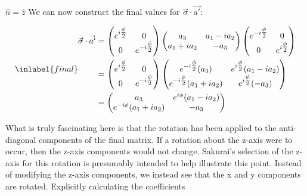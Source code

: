 \begin{answer}
\begin{answerpart}{\texorpdfstring{$\hat{n} = \hat{z}$}{n = z}}
    We can now construct the final values for $\vec{\sigma} \cdot
    \vec{a'}$:

    \begin{equation}
      \inlabel{final}
      \begin{split}
        \vec{\sigma} \cdot \vec{a'}
        &=
        \begin{pmatrix}
          e^{i \tfrac \phi 2} & 0\\
          0 & e^{-i \tfrac \phi 2}\\
        \end{pmatrix}
        \begin{pmatrix}
          a_3  & a_1 - ia_2 \\
          a_1 + ia_2 & -a_3 \\
        \end{pmatrix}
        \begin{pmatrix}
          e^{-i \tfrac \phi 2} & 0\\
          0 & e^{i \tfrac \phi 2}\\
        \end{pmatrix}\\
        &=
        \begin{pmatrix}
          e^{i \tfrac \phi 2} & 0\\
          0 & e^{-i \tfrac \phi 2}\\
        \end{pmatrix}
        \begin{pmatrix}
          e^{-i \tfrac \phi 2}(a_3)  & e^{i \tfrac \phi 2}(a_1 - ia_2) \\
          e^{-i \tfrac \phi 2}(a_1 + ia_2) & e^{i \tfrac \phi 2}(-a_3) \\
        \end{pmatrix}\\
        &=
        \begin{pmatrix}
          a_3  & e^{i\phi}(a_1 - ia_2) \\
          e^{-i\phi}(a_1 + ia_2) & -a_3 \\
        \end{pmatrix}\\
      \end{split}
    \end{equation}

    What is truly fascinating here is that the rotation has been
    applied to the anti-diagonal components of the final matrix.  If a
    rotation about the z-axis were to occur, then the z-axis
    components would not change.  Sakurai's selection of the z-axis
    for this rotation is presumably intended to help illustrate this
    point.  Instead of modifying the z-axis components, we instead see
    that the x and y components are rotated.  Explicitly calculating
    the coefficients


\end{answerpart}
\end{answer}
